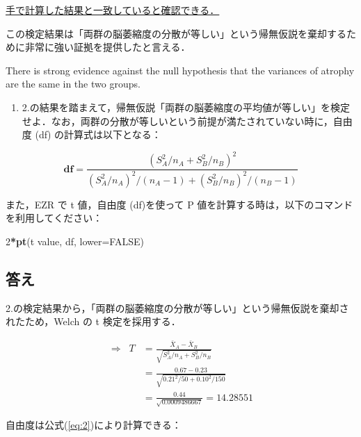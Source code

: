 \documentclass[11pt,]{problemset}
\newenvironment{Shaded}{\begin{snugshade}}{\end{snugshade}}
\newcommand{\DataTypeTok}[1]{\textcolor[rgb]{0.13,0.29,0.53}{#1}}
\newcommand{\DecValTok}[1]{\textcolor[rgb]{0.00,0.00,0.81}{#1}}
\newcommand{\KeywordTok}[1]{\textcolor[rgb]{0.13,0.29,0.53}{\textbf{#1}}}
\newcommand{\NormalTok}[1]{#1}
\newcommand{\OperatorTok}[1]{\textcolor[rgb]{0.81,0.36,0.00}{\textbf{#1}}}
\newcommand{\OtherTok}[1]{\textcolor[rgb]{0.56,0.35,0.01}{#1}}
\providecommand{\tightlist}{%
  \setlength{\itemsep}{0pt}\setlength{\parskip}{0pt}}
\begin{document}
\underline{手で計算した結果と一致していると確認できる．}

この検定結果は「両群の脳萎縮度の分散が等しい」という帰無仮説を棄却するために非常に強い証拠を提供したと言える．

There is strong evidence against the null hypothesis that the variances
of atrophy are the same in the two groups.

\newpage
\vfill

\begin{enumerate}
\def\labelenumi{\arabic{enumi}.}
\setcounter{enumi}{2}
\tightlist
\item
  2.の結果を踏まえて，帰無仮説「両群の脳萎縮度の平均値が等しい」を検定せよ．なお，両群の分散が等しいという前提が満たされていない時に，自由度
  (df) の計算式は以下となる：
\end{enumerate}

\begin{equation}
\label{eq:2}
\mathbf{df} = \frac{(S^2_A/n_A + S^2_B/n_B)^2}{(S_A^2/n_A)^2/(n_A-1)+(S_B^2/n_B)^2/(n_B-1)}
\end{equation}

また，EZR で t 値，自由度 (df)を使って P
値を計算する時は，以下のコマンドを利用してください：

\begin{Shaded}
\begin{Highlighting}[]
\DecValTok{2}\OperatorTok{*}\KeywordTok{pt}\NormalTok{(t value, df, }\DataTypeTok{lower=}\OtherTok{FALSE}\NormalTok{)}
\end{Highlighting}
\end{Shaded}

\hypertarget{-2}{%
\subsection{答え}\label{-2}}

2.の検定結果から，「両群の脳萎縮度の分散が等しい」という帰無仮説を棄却されたため，Welch
の t 検定を採用する．

\[
\begin{aligned}
\Rightarrow\;\; T & = \frac{\bar{X}_A - \bar{X}_B}{\sqrt{S^2_A/n_A + S^2_B/n_B}} \\ 
                  & = \frac{0.67 - 0.23}{\sqrt{0.21^2/50 + 0.10^2/150}} \\ 
                  & = \frac{0.44}{\sqrt{0.0009486667}} = 14.28551
\end{aligned}
\]

自由度は公式(\ref{eq:2})により計算できる：
\end{document}
